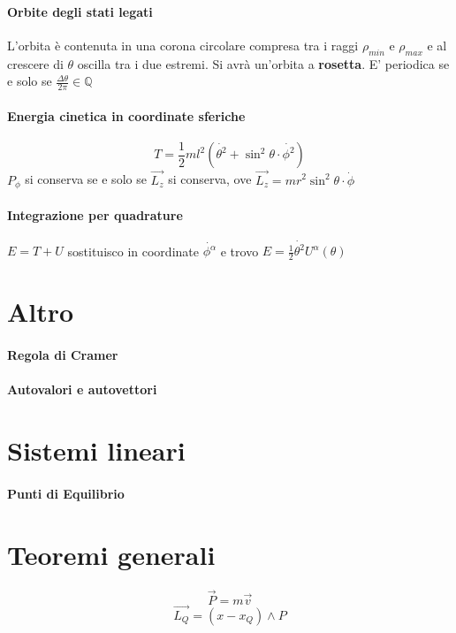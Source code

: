 \documentclass[a4paper,12pt]{article}
\begin{document}
\paragraph{Orbite degli stati legati}
L'orbita è contenuta in una corona circolare compresa tra i raggi $\rho_{min}$ e $\rho_{max}$ e al crescere di $\theta$ oscilla tra i due estremi. Si avrà un'orbita a \textbf{ rosetta}. E' periodica se e solo se $\frac{\Delta\theta}{2\pi}\in\mathbb{Q}$
\paragraph{Energia cinetica in coordinate sferiche}
\begin{displaymath}
T=\frac{1}{2}ml^2(\dot{\theta^2}+\sin^2\theta \cdot \dot{\phi^2})
\end{displaymath}
$P_{\phi}$ si conserva se e solo se $\vec{L_z}$ si conserva, ove $\vec{L_z}=mr^2\sin^2\theta\cdot\dot{\phi}$
\paragraph{Integrazione per quadrature}
$E=T+U$ sostituisco in coordinate $\dot{\phi^{\alpha}}$ e trovo $E=\frac{1}{2}\dot{\theta^2}U^{\alpha}(\theta)$

\section{Altro}
\paragraph{Regola di Cramer}
\paragraph{Autovalori e autovettori}

\section{Sistemi lineari}
\paragraph{Punti di Equilibrio}

\section{Teoremi generali}
\paragraph{}
$$
\vec{P} = m\vec{v}$$
$$
\vec{L_Q} = (x-x_Q)\wedge P
$$
\end{document}
